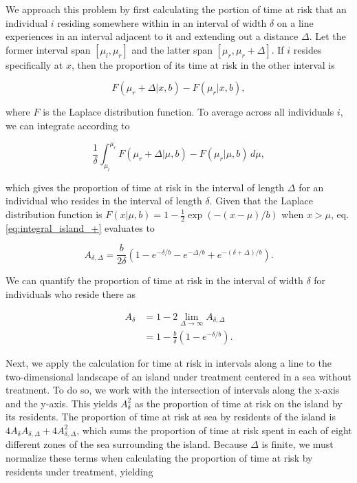 \documentclass[11pt]{amsart}
\begin{document}
We approach this problem by first calculating the portion of time at risk that an individual $i$ residing somewhere within in an interval of width $\delta$ on a line experiences in an interval adjacent to it and extending out a distance $\Delta$. Let the former interval span $[\mu_l,\mu_r]$ and the latter span $[\mu_r,\mu_r+\Delta]$. If $i$ resides specifically at $x$, then the proportion of its time at risk in the other interval is

\begin{equation}
F(\mu_r+\Delta|x,b) - F(\mu_r|x,b) ,
\end{equation}

\noindent where $F$ is the Laplace distribution function. To average across all individuals $i$, we can integrate according to

\begin{equation}
\frac{1}{\delta} \int_{\mu_l}^{\mu_r} F(\mu_r+\Delta|\mu,b) - F(\mu_r|\mu,b) \, d\mu ,
\label{eq:integral_island_+}
\end{equation}

\noindent which gives the proportion of time at risk in the interval of length $\Delta$ for an individual who resides in the interval of length $\delta$. Given that the Laplace distribution function is $F(x|\mu,b)=1-\frac{1}{2}\exp(-(x-\mu)/b)$ when $x>\mu$, eq. \eqref{eq:integral_island_+} evaluates to 

\begin{equation}
A_{\delta,\Delta} = \frac{b}{2\delta} \left(1 - e^{-\delta/b} - e^{-\Delta/b} + e^{-(\delta + \Delta)/b} \right) .
\label{eq:AdeltaDelta}
\end{equation}

\noindent We can quantify the proportion of time at risk in the interval of width $\delta$ for individuals who reside there as 

\begin{align}
A_\delta &= 1 - 2 \lim_{\Delta\rightarrow\infty} A_{\delta,\Delta} \\
 &= 1 - \frac{b}{\delta}\left( 1 - e^{-\delta/b} \right) .
\label{eq:Adelta}
\end{align}

Next, we apply the calculation for time at risk in intervals along a line to the two-dimensional landscape of an island under treatment centered in a sea without treatment. To do so, we work with the intersection of intervals along the x-axis and the y-axis. This yields $A_{\delta}^2$ as the proportion of time at risk on the island by its residents. The proportion of time at risk at sea by residents of the island is $4 A_{\delta} A_{\delta,\Delta} + 4 A_{\delta,\Delta}^2$, which sums the proportion of time at risk spent in each of eight different zones of the sea surrounding the island. Because $\Delta$ is finite, we must normalize these terms when calculating the proportion of time at risk by residents under treatment, yielding
\end{document}
